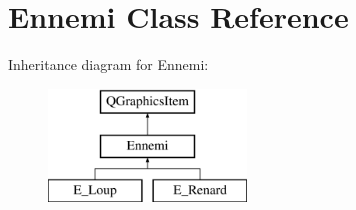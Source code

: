 \hypertarget{class_ennemi}{}\section{Ennemi Class Reference}
\label{class_ennemi}
Inheritance diagram for Ennemi\+:\begin{figure}[H]
\begin{center}
\leavevmode
\includegraphics[height=3.000000cm]{class_ennemi}
\end{center}
\end{figure}
